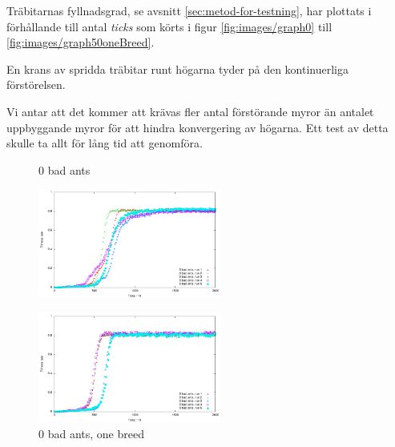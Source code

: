 \documentclass[titlepage, a4paper, 12pt]{article}
\begin{document}
Träbitarnas fyllnadsgrad, se avsnitt \ref{sec:metod-for-testning}, har
plottats i förhållande till antal \textit{ticks} som körts i figur
\ref{fig:images/graph0} till \ref{fig:images/graph50oneBreed}.



En krans av spridda träbitar runt
högarna tyder på den kontinuerliga förstörelsen.

Vi antar att det kommer att krävas fler antal förstörande myror än
antalet uppbyggande myror för att hindra konvergering av högarna. Ett
test av detta skulle ta allt för lång tid att genomföra.


\begin{figure}
  \begin{minipage}[b]{0.5\linewidth}
    \centering
    \caption{0  bad ants }\label{fig:images/graph0}
    \includegraphics[width=6cm]{images/graph0.pdf}
  \end{minipage}
  \begin{minipage}[b]{0.5\linewidth}
    \centering
    \caption{0 bad ants, one breed }\label{fig:images/graph0oneBreed}
    \includegraphics[width=6cm]{images/graph0oneBreed.pdf}
  \end{minipage}
  
  \hspace{0.5cm}
  

\end{figure}
\end{document}

